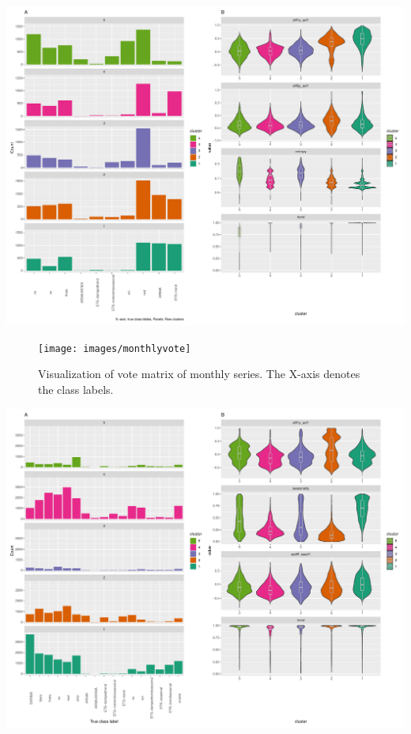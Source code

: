 \documentclass[11pt,a4paper,]{article}
\begin{document}
\begin{center}\includegraphics[width=\textwidth]{figure/classdisyearly-1} \end{center}

\clearpage

\begin{figure}[h]

{\centering \texttt{[image: images/monthlyvote]} 

}

\caption{Visualization of vote matrix of monthly series. The X-axis denotes the class labels.}\label{fig:unnamed-chunk-2}
\end{figure}

\begin{center}\includegraphics[width=\textwidth]{figure/classlabledismonthly-1} \end{center}
\end{document}
